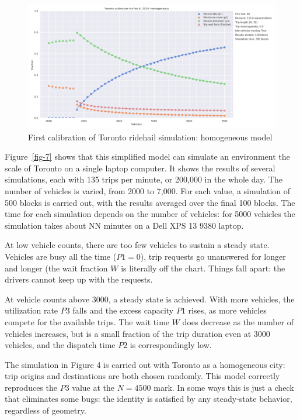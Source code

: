 \documentclass[
  letterpaper,
]{article}
\begin{document}
\begin{figure}

{\centering \includegraphics{toronto_calibration_homogeneous.png}

}

\caption{First calibration of Toronto ridehail simulation: homogeneous
model}

\end{figure}

Figure~\ref{fig-7} shows that this simplified model can simulate an
environment the scale of Toronto on a single laptop computer. It shows
the results of several simulations, each with 135 trips per minute, or
200,000 in the whole day. The number of vehicles is varied, from 2000 to
7,000. For each value, a simulation of 500 blocks is carried out, with
the results averaged over the final 100 blocks. The time for each
simulation depends on the number of vehicles: for 5000 vehicles the
simulation takes about NN minutes on a Dell XPS 13 9380 laptop.

At low vehicle counts, there are too few vehicles to sustain a steady
state. Vehicles are busy all the time (\(P1 = 0\)), trip requests go
unanswered for longer and longer (the wait fraction \(W\) is literally
off the chart. Things fall apart: the drivers cannot keep up with the
requests.

At vehicle counts above 3000, a steady state is achieved. With more
vehicles, the utilization rate \(P3\) falls and the excess capacity
\(P1\) rises, as more vehicles compete for the available trips. The wait
time \(W\) does decrease as the number of vehicles increases, but is a
small fraction of the trip duration even at 3000 vehicles, and the
dispatch time \(P2\) is correspondingly low.

The simulation in Figure 4 is carried out with Toronto as a homogeneous
city: trip origins and destinations are both chosen randomly. This model
correctly reproduces the \(P3\) value at the \(N = 4500\) mark. In some
ways this is just a check that eliminates some bugs: the identity is
satisfied by any steady-state behavior, regardless of geometry.
\end{document}
